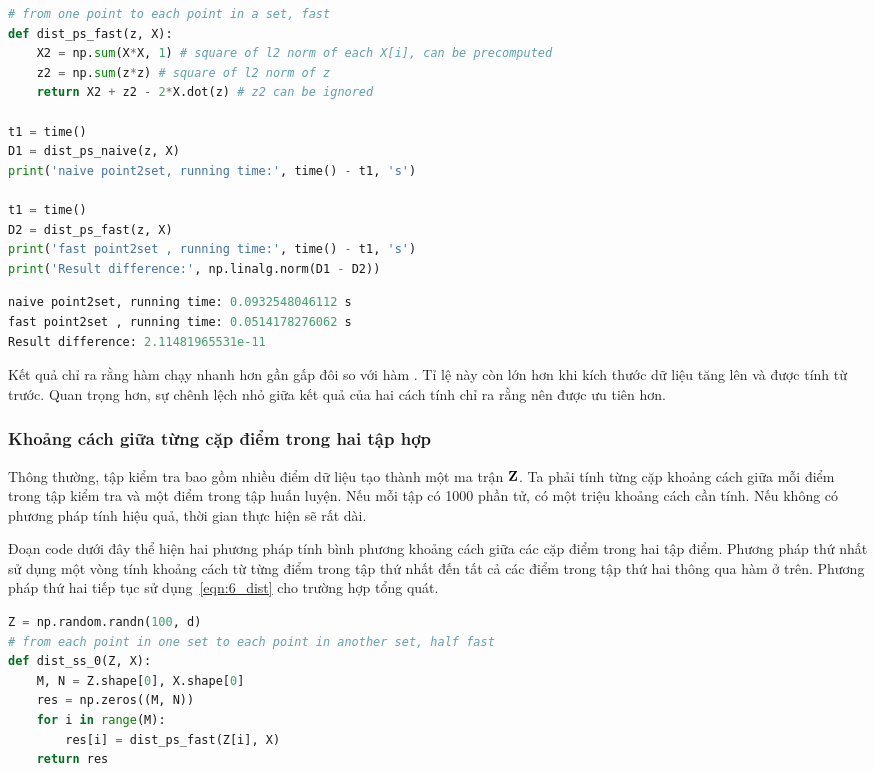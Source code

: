 \newpage
\begin{lstlisting}[language=Python]
# from one point to each point in a set, fast
def dist_ps_fast(z, X):
    X2 = np.sum(X*X, 1) # square of l2 norm of each X[i], can be precomputed
    z2 = np.sum(z*z) # square of l2 norm of z
    return X2 + z2 - 2*X.dot(z) # z2 can be ignored

t1 = time()
D1 = dist_ps_naive(z, X)
print('naive point2set, running time:', time() - t1, 's')

t1 = time()
D2 = dist_ps_fast(z, X)
print('fast point2set , running time:', time() - t1, 's')
print('Result difference:', np.linalg.norm(D1 - D2))
\end{lstlisting}

\kq
\begin{lstlisting}[language=Python]
naive point2set, running time: 0.0932548046112 s
fast point2set , running time: 0.0514178276062 s
Result difference: 2.11481965531e-11
\end{lstlisting}

Kết quả chỉ ra rằng hàm  chạy nhanh hơn gần
gấp đôi so với hàm . Tỉ lệ này còn lớn hơn
khi kích thước dữ liệu tăng lên và  được tính từ trước. Quan trọng hơn, sự chênh lệch nhỏ giữa kết quả của hai cách tính chỉ ra rằng  nên được ưu tiên hơn.

\subsubsection{Khoảng cách giữa từng cặp điểm trong hai tập hợp}
Thông thường, tập kiểm tra bao gồm nhiều điểm dữ liệu tạo thành một ma trận
$\mathbf{Z}$. Ta phải tính từng cặp khoảng cách giữa mỗi điểm trong tập kiểm tra và một
điểm trong tập huấn luyện. Nếu mỗi tập có 1000 phần tử, có một triệu khoảng cách
cần tính. Nếu không có phương pháp tính hiệu quả, thời gian thực hiện sẽ rất dài.

Đoạn code dưới đây thể hiện hai phương pháp tính bình phương khoảng cách giữa
các cặp điểm trong hai tập điểm. Phương pháp thứ nhất sử dụng một vòng
 tính khoảng cách từ từng điểm trong tập thứ nhất đến tất cả
các điểm trong tập thứ hai thông qua hàm
 ở trên. Phương pháp thứ hai tiếp tục sử
dụng~\eqref{eqn:6_dist} cho trường hợp tổng quát.


\begin{lstlisting}[language=Python]
Z = np.random.randn(100, d)
# from each point in one set to each point in another set, half fast
def dist_ss_0(Z, X):
    M, N = Z.shape[0], X.shape[0]
    res = np.zeros((M, N))
    for i in range(M):
        res[i] = dist_ps_fast(Z[i], X)
    return res
\end{lstlisting}

